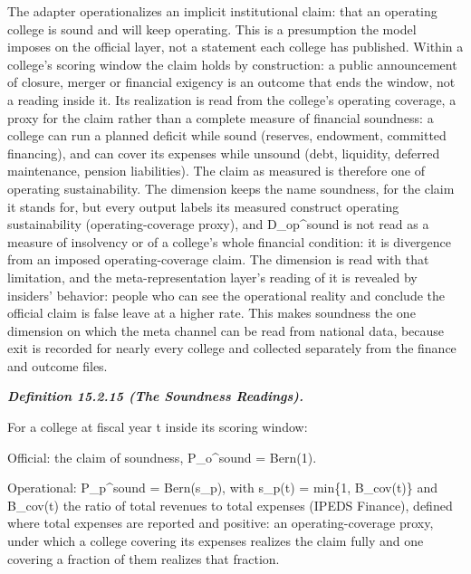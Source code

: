 \documentclass[
]{article}
\begin{document}
The adapter operationalizes an implicit institutional claim: that an
operating college is sound and will keep operating. This is a
presumption the model imposes on the official layer, not a statement
each college has published. Within a college's scoring window the claim
holds by construction: a public announcement of closure, merger or
financial exigency is an outcome that ends the window, not a reading
inside it. Its realization is read from the college's operating
coverage, a proxy for the claim rather than a complete measure of
financial soundness: a college can run a planned deficit while sound
(reserves, endowment, committed financing), and can cover its expenses
while unsound (debt, liquidity, deferred maintenance, pension
liabilities). The claim as measured is therefore one of operating
sustainability. The dimension keeps the name soundness, for the claim it
stands for, but every output labels its measured construct operating
sustainability (operating-coverage proxy), and D\_op\^{}sound is not
read as a measure of insolvency or of a college's whole financial
condition: it is divergence from an imposed operating-coverage claim.
The dimension is read with that limitation, and the meta-representation
layer's reading of it is revealed by insiders' behavior: people who can
see the operational reality and conclude the official claim is false
leave at a higher rate. This makes soundness the one dimension on which
the meta channel can be read from national data, because exit is
recorded for nearly every college and collected separately from the
finance and outcome files.

\emph{\textbf{Definition 15.2.15 (The Soundness Readings).}}

For a college at fiscal year t inside its scoring window:

Official: the claim of soundness, P\_o\^{}sound = Bern(1).

Operational: P\_p\^{}sound = Bern(s\_p), with s\_p(t) = min\{1,
B\_cov(t)\} and B\_cov(t) the ratio of total revenues to total expenses
(IPEDS Finance), defined where total expenses are reported and positive:
an operating-coverage proxy, under which a college covering its expenses
realizes the claim fully and one covering a fraction of them realizes
that fraction.
\end{document}
